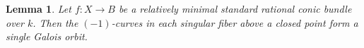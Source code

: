 \documentclass[a4paper, 11pt, reqno]{amsart}
\numberwithin{equation}{section} \numberwithin{figure}{section}
\DeclareMathOperator{\Pic}{Pic}
\DeclareMathOperator{\Gal}{Gal}
\DeclareMathOperator{\Frob}{Frob}
\def \F {{\mathbb F}}
\def \P {{\mathbb P}}
\newcommand{\ra}{\rightarrow}
\newtheorem{lemma}{Lemma}
\theoremstyle{definition}
\numberwithin{lemma}{section}
\begin{document}

\begin{lemma}\label{lem:orbitsinsingularfibers}
    Let $f \colon X \ra B$ be a relatively minimal standard rational conic bundle over $k$. Then the $(-1)$-curves in each singular fiber above a closed point form a single Galois orbit. 
\end{lemma}
\end{document}
